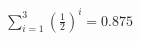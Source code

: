 \documentclass[preview]{standalone}
\begin{document}
\begin{align*}
\sum_{i=1}^{3} (\frac{1}{2})^i = {0.875}
\end{align*}
\end{document}
